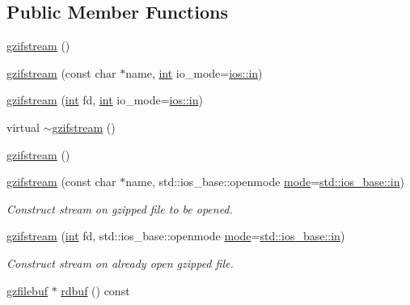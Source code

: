 \subsection*{Public Member Functions}
\begin{DoxyCompactItemize}
\item 
\mbox{\hyperlink{classgzifstream_a6fa19ba2a1eeaeab5f0a408082bc2edd}{gzifstream}} ()
\item 
\mbox{\hyperlink{classgzifstream_a56e464903ee517fb3377f9d8a2977694}{gzifstream}} (const char $\ast$name, \mbox{\hyperlink{ioapi_8h_a787fa3cf048117ba7123753c1e74fcd6}{int}} io\+\_\+mode=\mbox{\hyperlink{gun_8c_a8bab68b4d22f69428207fabb60dc4f5c}{ios\+::in}})
\item 
\mbox{\hyperlink{classgzifstream_ab1380a28c963c7b3b85dc63d0d11cc1a}{gzifstream}} (\mbox{\hyperlink{ioapi_8h_a787fa3cf048117ba7123753c1e74fcd6}{int}} fd, \mbox{\hyperlink{ioapi_8h_a787fa3cf048117ba7123753c1e74fcd6}{int}} io\+\_\+mode=\mbox{\hyperlink{gun_8c_a8bab68b4d22f69428207fabb60dc4f5c}{ios\+::in}})
\item 
virtual \mbox{\hyperlink{classgzifstream_a61a1c9344f4d50c2ae7b3e555a509385}{$\sim$gzifstream}} ()
\item 
\mbox{\hyperlink{classgzifstream_a6fa19ba2a1eeaeab5f0a408082bc2edd}{gzifstream}} ()
\item 
\mbox{\hyperlink{classgzifstream_a90f6e0eea83b7ce3c64f755b51b5b011}{gzifstream}} (const char $\ast$name, std\+::ios\+\_\+base\+::openmode \mbox{\hyperlink{ioapi_8h_a7e43d41c2fe013a373b540cba02505cf}{mode}}=\mbox{\hyperlink{gun_8c_a8bab68b4d22f69428207fabb60dc4f5c}{std\+::ios\+\_\+base\+::in}})
\begin{DoxyCompactList}\small\item\em Construct stream on gzipped file to be opened. \end{DoxyCompactList}\item 
\mbox{\hyperlink{classgzifstream_aa5ab9dcc3ab35bffe781f4c49239826e}{gzifstream}} (\mbox{\hyperlink{ioapi_8h_a787fa3cf048117ba7123753c1e74fcd6}{int}} fd, std\+::ios\+\_\+base\+::openmode \mbox{\hyperlink{ioapi_8h_a7e43d41c2fe013a373b540cba02505cf}{mode}}=\mbox{\hyperlink{gun_8c_a8bab68b4d22f69428207fabb60dc4f5c}{std\+::ios\+\_\+base\+::in}})
\begin{DoxyCompactList}\small\item\em Construct stream on already open gzipped file. \end{DoxyCompactList}\item 
\mbox{\hyperlink{classgzfilebuf}{gzfilebuf}} $\ast$ \mbox{\hyperlink{classgzifstream_a1c5a0ab4f99f8d8e3406af7bfd82b133}{rdbuf}} () const

\end{DoxyCompactItemize}
